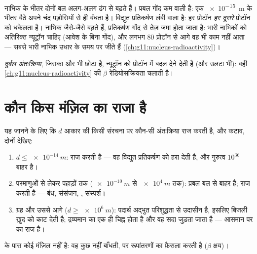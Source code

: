 \begin{remark}[नाभिक क्यों टिकते हैं --- और भारी नाभिक क्यों हार जाते हैं]\label{rem:g11:fundamental-interactions:nuclei}
नाभिक के भीतर दोनों बल अलग-अलग ढंग से बढ़ते हैं। प्रबल गोंद
कम  वाली है: एक  \qty{e-15}{m} के भीतर बैठे अपने चंद
पड़ोसियों से ही बँधता है। विद्युत प्रतिकर्षण लंबी  वाला है: हर प्रोटॉन
\emph{हर दूसरे} प्रोटॉन को धकेलता है। नाभिक जैसे-जैसे बढ़ते हैं, प्रतिकर्षण
गोंद से तेज़ जमा होता जाता है: भारी नाभिकों को अतिरिक्त न्यूट्रॉन चाहिए (आवेश
के बिना गोंद), और लगभग $80$ प्रोटॉन से आगे वह भी काम नहीं आता --- सबसे
भारी नाभिक उधार के समय पर जीते हैं (\cref{ch:g11:nucleus-radioactivity})।
\end{remark}

\begin{definition}[दुर्बल अंतःक्रिया]\label{def:g11:fundamental-interactions:weak}
\emph{दुर्बल अंतःक्रिया}, जिसका  और भी
छोटा है, न्यूट्रॉन को प्रोटॉन में बदल देने देती है (और उलटा भी): वही
\cref{ch:g11:nucleus-radioactivity} की $\beta$ रेडियोसक्रियता चलाती है।
\end{definition}

\section{कौन किस मंज़िल का राजा है}

\begin{method}[किसी पैमाने का लेखा-जोखा]\label{met:g11:fundamental-interactions:audit}
यह जानने के लिए कि $d$ आकार की किसी संरचना पर कौन-सी अंतःक्रिया राज करती
है,  और कटाव, दोनों देखिए:
\begin{enumerate}
  \item $d \leq \qty{e-14}{m}$: \emph{} राज करती है --- वह विद्युत
        प्रतिकर्षण को हरा देती है, और गुरुत्व $10^{36}$ बाहर है।
  \item परमाणुओं से लेकर पहाड़ों तक ($\qty{e-10}{m}$ से $\qty{e4}{m}$ तक): प्रबल
        बल  से बाहर है; \emph{} राज करती है --- बंध, संसंजन, , संस्पर्श।
  \item ग्रह और उससे आगे ($d \geq \qty{e6}{m}$): पदार्थ अद्भुत परिशुद्धता से उदासीन है,
        इसलिए बिजली ख़ुद को काट देती है; द्रव्यमान का एक ही चिह्न होता है और
        वह सदा जुड़ता जाता है --- आसमान पर \emph{} का
        राज है।
\end{enumerate}
 के पास कोई मंज़िल नहीं है: वह कुछ नहीं बाँधती, पर
रूपांतरणों का फ़ैसला करती है ($\beta$ क्षय)।
\end{method}

